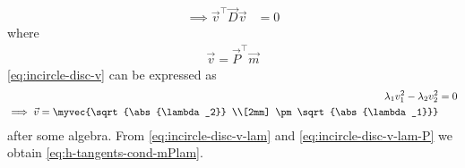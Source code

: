 \begin{enumerate}[label=\thesubsection.\arabic*,ref=\thesubsection.\theenumi]
\begin{align}
\implies 
\vec{v}^{\top}\vec{D}\vec{v} &= 0
	\label{eq:incircle-disc-v}
\end{align}
where 
\begin{align}
	\label{eq:incircle-disc-v-lam-P}
\vec{v} = \vec{P}^{\top}\vec{m}
\end{align}
	\eqref{eq:incircle-disc-v}
	can be expressed as 
\begin{align}
\lambda_1 v_1^2
-\lambda_2 v_2^2 &= 0
\\
\implies \vec{v} = \myvec{\sqrt{\abs{\lambda_2}} \\[2mm]  \pm \sqrt{\abs{\lambda_1}}}
	\label{eq:incircle-disc-v-lam}
\end{align}
after some algebra.
From 
	\eqref{eq:incircle-disc-v-lam}
	and
	\eqref{eq:incircle-disc-v-lam-P}
	we obtain 
	  \eqref{eq:h-tangents-cond-mPlam}.
	  \end{enumerate}
